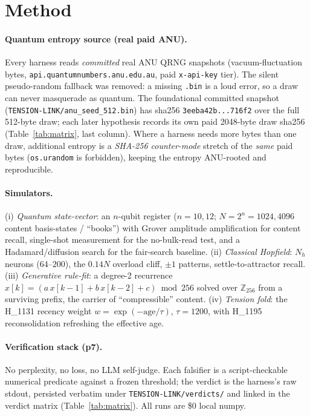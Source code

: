 \documentclass[11pt,a4paper]{article}
\begin{document}
\section{Method}
\label{sec:method}

\paragraph{Quantum entropy source (real paid ANU).}
Every harness reads \emph{committed} real ANU QRNG snapshots
(vacuum-fluctuation bytes, \verb|api.quantumnumbers.anu.edu.au|, paid
\texttt{x-api-key} tier). The silent pseudo-random fallback was removed: a missing
\texttt{.bin} is a loud error, so a draw can never masquerade as quantum. The
foundational committed snapshot (\texttt{TENSION-LINK/anu\_seed\_512.bin}) has
sha256 \verb|3eeba42b...716f2| over the full 512-byte draw; each later hypothesis
records its own paid 2048-byte draw sha256 (Table~\ref{tab:matrix}, last column).
Where a harness needs more bytes than one draw, additional entropy is a
\emph{SHA-256 counter-mode} stretch of the \emph{same} paid bytes
(\verb|os.urandom| is forbidden), keeping the entropy ANU-rooted and reproducible.

\paragraph{Simulators.}
(i) \emph{Quantum state-vector}: an $n$-qubit register ($n\!=\!10,12$;
$N=2^{n}=1024,4096$ content basis-states / ``books'') with Grover amplitude
amplification for content recall, single-shot measurement for the no-bulk-read
test, and a Hadamard/diffusion search for the fair-search baseline. (ii)
\emph{Classical Hopfield}: $N_h$ neurons ($64$--$200$), the $0.14N$ overload
cliff, $\pm 1$ patterns, settle-to-attractor recall. (iii) \emph{Generative
rule-fit}: a degree-2 recurrence $x[k]=(a\,x[k-1]+b\,x[k-2]+c)\bmod 256$ solved
over $\mathbb{Z}_{256}$ from a surviving prefix, the carrier of ``compressible''
content. (iv) \emph{Tension fold}: the H\_1131 recency weight
$w=\exp(-\mathrm{age}/\tau)$, $\tau=1200$, with H\_1195 reconsolidation refreshing
the effective age.

\paragraph{Verification stack (p7).}
No perplexity, no loss, no LLM self-judge. Each falsifier is a script-checkable
numerical predicate against a frozen threshold; the verdict is the harness's raw
stdout, persisted verbatim under \texttt{TENSION-LINK/verdicts/} and linked in the
verdict matrix (Table~\ref{tab:matrix}). All runs are \$0 local numpy.
\end{document}
